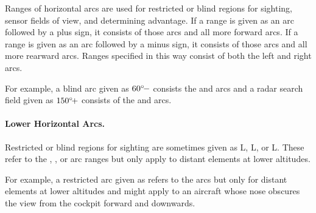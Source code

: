 {Ranges of horizontal arcs are used for restricted or blind regions for sighting, sensor fields of view, and determining advantage. If a range is given as an arc followed by a plus sign, it consists of those arcs and all more forward arcs. If a range is given as an arc followed by a minus sign, it consists of those arcs and all more rearward arcs. Ranges specified in this way consist of both the left and right arcs.

For example, a blind arc given as $\mbox{$60{^\circ}\!-$}$ consists the  and  arcs and a radar search field given as $\mbox{$150{^\circ}\!+$}$ consists of the  and  arcs. 

\paragraph{Lower Horizontal Arcs.}
\label{rule:lower-angle-off-arcs}

Restricted or blind regions for sighting are sometimes given as L, L, or L. These refer to the , , or  arc ranges but only apply to distant elements at lower altitudes.

For example, a restricted arc given as  refers to the  arcs but only for distant elements at lower altitudes and might apply to an aircraft whose nose obscures the view from the cockpit forward and downwards.

}


